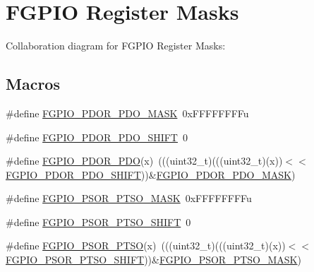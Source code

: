 \hypertarget{group___f_g_p_i_o___register___masks}{}\section{F\+G\+P\+IO Register Masks}
\label{group___f_g_p_i_o___register___masks}
Collaboration diagram for F\+G\+P\+IO Register Masks\+:
\subsection*{Macros}
\begin{DoxyCompactItemize}
\item 
\#define \hyperlink{group___f_g_p_i_o___register___masks_ga36d3575737128f82053b0b713c2ba12c}{F\+G\+P\+I\+O\+\_\+\+P\+D\+O\+R\+\_\+\+P\+D\+O\+\_\+\+M\+A\+SK}~0x\+F\+F\+F\+F\+F\+F\+F\+Fu
\item 
\#define \hyperlink{group___f_g_p_i_o___register___masks_gac47066e363d078fd698fccc3e2717b7e}{F\+G\+P\+I\+O\+\_\+\+P\+D\+O\+R\+\_\+\+P\+D\+O\+\_\+\+S\+H\+I\+FT}~0
\item 
\#define \hyperlink{group___f_g_p_i_o___register___masks_gafab743986cbbf8fdbf9ed322104e413d}{F\+G\+P\+I\+O\+\_\+\+P\+D\+O\+R\+\_\+\+P\+DO}(x)~(((uint32\+\_\+t)(((uint32\+\_\+t)(x))$<$$<$\hyperlink{group___f_g_p_i_o___register___masks_gac47066e363d078fd698fccc3e2717b7e}{F\+G\+P\+I\+O\+\_\+\+P\+D\+O\+R\+\_\+\+P\+D\+O\+\_\+\+S\+H\+I\+FT}))\&\hyperlink{group___f_g_p_i_o___register___masks_ga36d3575737128f82053b0b713c2ba12c}{F\+G\+P\+I\+O\+\_\+\+P\+D\+O\+R\+\_\+\+P\+D\+O\+\_\+\+M\+A\+SK})
\item 
\#define \hyperlink{group___f_g_p_i_o___register___masks_gae9ca2771800b24b305bfa09312e2ee3e}{F\+G\+P\+I\+O\+\_\+\+P\+S\+O\+R\+\_\+\+P\+T\+S\+O\+\_\+\+M\+A\+SK}~0x\+F\+F\+F\+F\+F\+F\+F\+Fu
\item 
\#define \hyperlink{group___f_g_p_i_o___register___masks_ga8a5cd9350700e90d57dfc2d6b27f9184}{F\+G\+P\+I\+O\+\_\+\+P\+S\+O\+R\+\_\+\+P\+T\+S\+O\+\_\+\+S\+H\+I\+FT}~0
\item 
\#define \hyperlink{group___f_g_p_i_o___register___masks_gab91ddcf26e7cb532e95e1aadef87b8a9}{F\+G\+P\+I\+O\+\_\+\+P\+S\+O\+R\+\_\+\+P\+T\+SO}(x)~(((uint32\+\_\+t)(((uint32\+\_\+t)(x))$<$$<$\hyperlink{group___f_g_p_i_o___register___masks_ga8a5cd9350700e90d57dfc2d6b27f9184}{F\+G\+P\+I\+O\+\_\+\+P\+S\+O\+R\+\_\+\+P\+T\+S\+O\+\_\+\+S\+H\+I\+FT}))\&\hyperlink{group___f_g_p_i_o___register___masks_gae9ca2771800b24b305bfa09312e2ee3e}{F\+G\+P\+I\+O\+\_\+\+P\+S\+O\+R\+\_\+\+P\+T\+S\+O\+\_\+\+M\+A\+SK})

\end{DoxyCompactItemize}
